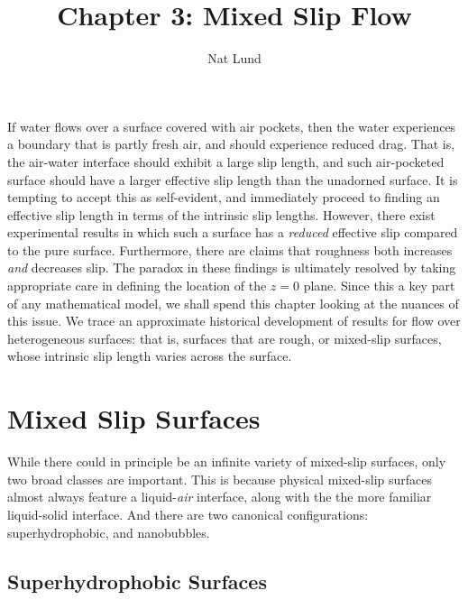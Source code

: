 \documentclass[a4paper]{report}
\title{Chapter 3: Mixed Slip Flow}
\author{Nat Lund}
\begin{document}
\maketitle

If water flows over a surface covered with air pockets, then the water experiences a boundary that is partly fresh air, and should experience reduced drag.  That is, the air-water interface should exhibit a large slip length, and such air-pocketed  surface should have a larger effective slip length than the unadorned surface.  It is tempting to accept this as self-evident, and immediately proceed to finding an effective slip length in terms of the intrinsic slip lengths.  However, there exist experimental results in which such a surface has a \emph{reduced} effective slip compared to the pure surface.  Furthermore, there are claims that roughness both increases \emph{and} decreases slip.  The paradox in these findings is ultimately resolved by taking appropriate care in defining the location of the $z=0$ plane.  Since this a key part of any mathematical model, we shall spend this chapter looking at the nuances of this issue.  We trace an approximate historical development of results for flow over heterogeneous surfaces: that is, surfaces that are rough, or mixed-slip surfaces,  whose intrinsic slip length varies across the surface.


\section{Mixed Slip Surfaces}

While there could in principle be an infinite variety of mixed-slip surfaces, only two broad classes are important.  This is because physical mixed-slip surfaces almost always feature a liquid-\emph{air} interface, along with the the more familiar liquid-solid interface.  And there are two canonical configurations: superhydrophobic, and nanobubbles.

\subsection{Superhydrophobic Surfaces}
\end{document}
